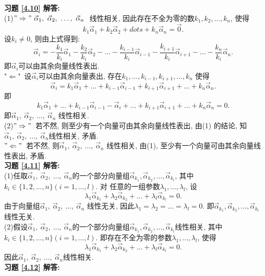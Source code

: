 \textbf{习题 \ref{4.10} 解答:}\\
(1)$"\Rightarrow"\  \vec{\alpha}_1, \ \vec{\alpha}_2, \ \dots,\ \vec{\alpha}_n\ $ 线性相关, 因此存在不全为零的数$k_1,k_2,\dots,k_n$, 使得
$$k_1\vec{\alpha}_1+k_2\vec{\alpha}_2+dots+k_n\vec{\alpha}_n=\vec{0}.$$
设$k_i\not=0 $, 则由上式得到:$$\vec{\alpha}_i=-\frac{k_1}{k_i}\vec{\alpha}_1-\frac{k_2}{k_i}\vec{\alpha}_2-\dots-\frac{k_{i-1}}{k_i}\vec{\alpha}_{i-1}-\frac{k_{i+1}}{k_i}\vec{\alpha}_{
i+1}-\dots-\frac{k_n}{k_i}\vec{\alpha}_n.$$
即$\vec{\alpha}_i$可以由其余向量线性表出.\\
"$\Leftarrow$"\ 设$\vec{\alpha}_i$可以由其余向量表出, 存在$k_1,\dots,k_{i-1},k_{i+1},\dots,k_n$ 使得$$\vec{\alpha}_i=k_1\vec{\alpha}_1+\dots+k_{i-1}\vec{\alpha}_{i-1}+k_{i+1}\vec{\alpha}_{i+1}+\dots+k_{n}\vec{\alpha}_{n}.$$ 即$$
k_1\vec{\alpha}_1+\dots+k_{i-1}\vec{\alpha}_{i-1}-\vec{\alpha}_i+\dots+k_{i+1}\vec{\alpha}_{i+1}+\dots+k_{n}\vec{\alpha}_{n}=0.$$
即$\vec{\alpha}_1, \ \vec{\alpha}_2, \ \dots,\ \vec{\alpha}_n$ 线性相关.\\
(2)$"\Rightarrow"$\ 若不然, 则至少有一个向量可由其余向量线性表出, 由(1) 的结论, 知$\vec{\alpha}_1, \ \vec{\alpha}_2, \ \dots,\ \vec{\alpha}_n$线性相关, 矛盾.\\
$"\Leftarrow"$\ 若不然, 则$\vec{\alpha}_1, \ \vec{\alpha}_2, \ \dots,\ \vec{\alpha}_n$ 线性相关, 由(1), 至少有一个向量可由其余向量线性表出, 矛盾.\\
\textbf{习题 \ref{4.11} 解答:}\\
(1)任取$\vec{\alpha}_1, \ \vec{\alpha}_2, \ \dots,\ \vec{\alpha}_n$的一个部分向量组$\vec{\alpha}_{k_1}, \vec{\alpha}_{k_2}, \dots, \vec{\alpha}_{k_l}$, 其中$k_i\in\{1,2,\dots,n\}(i=1,\dots,l)$. 对
任意的一组参数$\lambda_1,\dots,\lambda_l$, 设
$$\lambda_1\vec{\alpha}_{k_1}+\lambda_2\vec{\alpha}_{k_2}+\dots+\lambda_l\vec{\alpha}_{k_l}=0.$$
由于向量组$\vec{\alpha}_1, \ \vec{\alpha}_2, \ \dots,\ \vec{\alpha}_n$ 线性无关, 因此$\lambda_1=\lambda_2=\dots=\lambda_l=0$. 即$\vec{\alpha}_{k_1}, \vec{\alpha}_{k_2}, \dots, \vec{\alpha}_{k_l}$ 线性无关.\\
(2)假设$\vec{\alpha}_1, \ \vec{\alpha}_2, \ \dots,\ \vec{\alpha}_n$的一个部分向量组$\vec{\alpha}_{k_1}, \vec{\alpha}_{k_2}, \dots, \vec{\alpha}_{k_l}$线性相关,
其中$k_i\in\{1,2,\dots,n\}(i=1,\dots,l)$. 即存在不全为零的参数$\lambda_1,\dots,\lambda_l$,
使得$$\lambda_1\vec{\alpha}_{k_1}+\lambda_2\vec{\alpha}_{k_2}+\dots+\lambda_l\vec{\alpha}_{k_l}=0.$$
因此$\vec{\alpha}_1, \ \vec{\alpha}_2, \ \dots,\ \vec{\alpha}_n$线性相关.\\
\textbf{习题 \ref{4.12} 解答:}\\
